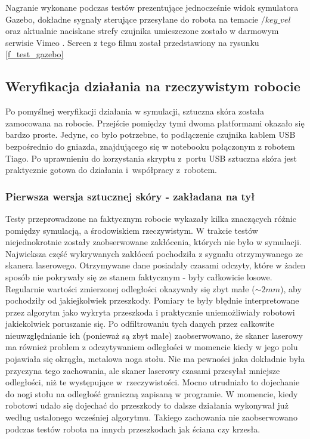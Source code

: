 Nagranie wykonane podczas testów prezentujące jednocześnie widok symulatora Gazebo, dokładne sygnały sterujące przesyłane do robota na temacie $/key\_vel$ oraz aktualnie naciskane strefy czujnika umieszczone zostało w darmowym serwisie Vimeo \cite{b_site_vimeo_gazebo}. Screen z tego filmu został przedstawiony na rysunku \ref{f_test_gazebo}

\subsection{Weryfikacja działania na rzeczywistym robocie}

Po pomyślnej weryfikacji działania w symulacji, sztuczna skóra została zamocowana na robocie. Przejście pomiędzy tymi dwoma platformami okazało się bardzo proste. Jedyne, co było potrzebne, to podłączenie czujnika kablem USB bezpośrednio do gniazda, znajdującego się w notebooku połączonym z robotem Tiago. Po uprawnieniu do korzystania skryptu z~portu USB sztuczna skóra jest praktycznie gotowa do działania i~współpracy z~robotem.

\subsubsection{Pierwsza wersja sztucznej skóry - zakładana na tył}
Testy przeprowadzone na faktycznym robocie wykazały kilka znaczących różnic pomiędzy symulacją, a środowiskiem rzeczywistym. W trakcie testów niejednokrotnie zostały zaobserwowane zakłócenia, których nie było w symulacji. Najwieksza część wykrywanych zakłóceń pochodziła z sygnału otrzymywanego ze skanera laserowego. Otrzymywane dane posiadały czasami odczyty, które w żaden sposób nie pokrywały się ze stanem faktycznym - były całkowicie losowe. Regularnie wartości zmierzonej odległości okazywały się zbyt małe ($\sim 2mm$), aby pochodziły od jakiejkolwiek przeszkody. Pomiary te były błędnie interpretowane przez algorytm jako wykryta przeszkoda i praktycznie uniemożliwiały robotowi jakiekolwiek poruszanie się. Po odfiltrowaniu tych danych przez całkowite nieuwzględnianie ich (ponieważ są zbyt małe) zaobserwowano, że skaner laserowy ma również problem z odczytywaniem odległości w momencie kiedy w jego polu pojawiała się okrągła, metalowa noga stołu. Nie ma pewności jaka dokładnie była przyczyna tego zachowania, ale skaner laserowy czasami przesyłał mniejsze odległości, niż te występujące w~rzeczywistości. Mocno utrudniało to dojechanie do nogi stołu na odległość graniczną zapisaną w programie. W momencie, kiedy robotowi udało się dojechać do przeszkody to dalsze działania wykonywał już według ustalonego wcześniej algorytmu. Takiego zachowania nie zaobserwowano podczas testów robota na innych przeszkodach jak ściana czy krzesła.


